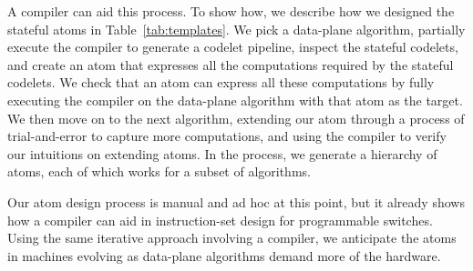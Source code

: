  A compiler can aid this process. To show how, we describe how we
designed the stateful atoms in Table~\ref{tab:templates}. We pick a data-plane
algorithm, partially execute the \pktlanguage compiler to generate a codelet pipeline,
inspect the stateful codelets, and create an atom that expresses
all the computations required by the stateful codelets. We check that an atom
can express all these computations by fully executing the compiler on the
data-plane algorithm with that atom as the target. We then move on to the next
algorithm, extending our atom through a process of trial-and-error to capture
more computations, and using the compiler to verify our intuitions on extending
atoms. In the process,  we generate a hierarchy of atoms, each of which works
for a subset of algorithms.

Our atom design process is manual and ad hoc at this point, but it already
shows how  a compiler can aid in instruction-set design for programmable
switches. Using the same iterative approach involving a compiler, we anticipate
the atoms in \absmachine machines evolving as data-plane algorithms demand more
of the hardware.

